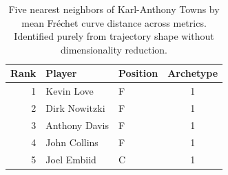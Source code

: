 \begin{table}[htbp]
  \centering\small
  \begin{tabular}{rllc}
    \toprule
    Rank & Player & Position & Archetype \\
    \midrule
    1 & Kevin Love & F & 1 \\
    2 & Dirk Nowitzki & F & 1 \\
    3 & Anthony Davis & F & 1 \\
    4 & John Collins & F & 1 \\
    5 & Joel Embiid & C & 1 \\
    \bottomrule
  \end{tabular}
  \caption{Five nearest neighbors of Karl-Anthony Towns by mean Fr\'{e}chet curve distance across metrics. Identified purely from trajectory shape without dimensionality reduction.}
  \label{tab:Karl_Anthony_Towns_frechet_curve_neighbors}
\end{table}

